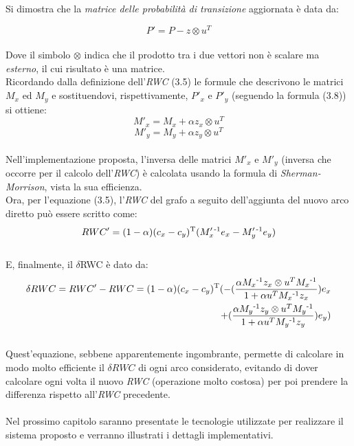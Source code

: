 Si dimostra che la \textit{matrice delle probabilità di transizione} aggiornata è data da:

\begin{equation}
P' = P - z \otimes u^T
\end{equation}
\\
Dove il simbolo $\otimes$ indica che il prodotto tra i due vettori non è scalare ma \textit{esterno}, il cui risultato è una matrice.
\\Ricordando dalla definizione dell'\textit{RWC} (3.5) le formule che descrivono le matrici $M_x$ ed $M_y$ e sostituendovi, rispettivamente, $P'_x$ e $P'_y$ (seguendo la formula (3.8)) si ottiene:
\\
\begin{equation}
M'_x = M_x + \alpha z_x \otimes u^T
\end{equation}
\begin{equation}
M'_y = M_y + \alpha z_y \otimes u^T
\end{equation}
\\
Nell'implementazione proposta, l'inversa delle matrici $M'_x$ e $M'_y$ (inversa che occorre per il calcolo dell'\textit{RWC}) è calcolata usando la formula di \textit{Sherman-Morrison}\cite{golub:paper}, vista la sua efficienza.
\\Ora, per l'equazione (3.5), l'\textit{RWC} del grafo a seguito dell'aggiunta del nuovo arco diretto può essere scritto come:
\\
\begin{equation}
RWC' = (1 - \alpha)(c_x - c_y)\textsuperscript{T}(M'_x\textsuperscript{-1}e_x - M'_y\textsuperscript{-1}e_y)
\end{equation}
\\
E, finalmente, il $\delta$RWC è dato da:
\\
\begin{equation}
\begin{split}
\delta RWC = RWC' - RWC = (1 - \alpha)(c_x - c_y)\textsuperscript{T}(-(\frac{\alpha M_x\textsuperscript{-1}z_x \otimes u^T M_x\textsuperscript{-1}}{1 + \alpha u^T M_x\textsuperscript{-1}z_x})e_x \\+ (\frac{\alpha M_y\textsuperscript{-1}z_y \otimes u^T M_y\textsuperscript{-1}}{1 + \alpha u^T M_y\textsuperscript{-1}z_y})e_y)
\end{split}
\end{equation}
\\ 
Quest'equazione, sebbene apparentemente ingombrante, permette di calcolare in modo molto efficiente il $\delta RWC$ di ogni arco considerato, evitando di dover calcolare ogni volta il nuovo \textit{RWC} (operazione molto costosa) per poi prendere la differenza rispetto all'\textit{RWC} precedente. 
\\\\
Nel prossimo capitolo saranno presentate le tecnologie utilizzate per realizzare il sistema proposto e verranno illustrati i dettagli implementativi.

